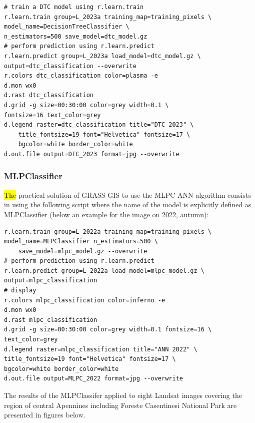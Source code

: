 \documentclass[eprint,
approc,		%
]{actapoly}
\begin{document}
\begin{footnotesize}
\begin{verbatim}
# train a DTC model using r.learn.train
r.learn.train group=L_2023a training_map=training_pixels \
model_name=DecisionTreeClassifier \
n_estimators=500 save_model=dtc_model.gz
# perform prediction using r.learn.predict
r.learn.predict group=L_2023a load_model=dtc_model.gz \
output=dtc_classification --overwrite
r.colors dtc_classification color=plasma -e
d.mon wx0
d.rast dtc_classification
d.grid -g size=00:30:00 color=grey width=0.1 \
fontsize=16 text_color=grey
d.legend raster=dtc_classification title="DTC 2023" \
	title_fontsize=19 font="Helvetica" fontsize=17 \
	bgcolor=white border_color=white
d.out.file output=DTC_2023 format=jpg --overwrite
\end{verbatim}
\end{footnotesize}

\subsubsection{MLPClassifier}

\hl{The} practical solution of GRASS GIS to use the MLPC ANN algorithm \cite{Rosenblatt} consists in using the following script where the name of the model is explicitly defined as MLPClassifier (below an example for the image on 2022, autumn): 

\begin{footnotesize}
\begin{verbatim}
r.learn.train group=L_2022a training_map=training_pixels \
model_name=MLPClassifier n_estimators=500 \
    save_model=mlpc_model.gz --overwrite
# perform prediction using r.learn.predict
r.learn.predict group=L_2022a load_model=mlpc_model.gz \
output=mlpc_classification
# display
r.colors mlpc_classification color=inferno -e
d.mon wx0
d.rast mlpc_classification
d.grid -g size=00:30:00 color=grey width=0.1 fontsize=16 \
text_color=grey
d.legend raster=mlpc_classification title="ANN 2022" \
title_fontsize=19 font="Helvetica" fontsize=17 \
bgcolor=white border_color=white
d.out.file output=MLPC_2022 format=jpg --overwrite
\end{verbatim}
\end{footnotesize}

The results of the MLPClassifer applied to eight Landsat images covering the region of central Apennines including Foreste Casentinesi National Park are presented in figures below.
\end{document}
